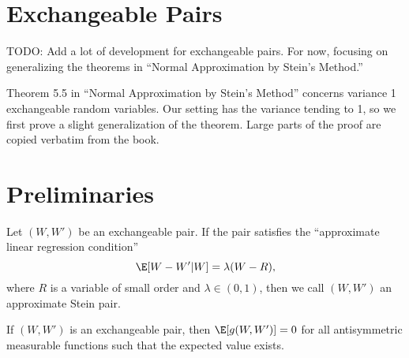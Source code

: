 \section{Exchangeable Pairs}
TODO: Add a lot of development for exchangeable pairs.  For now, focusing on generalizing the theorems
in ``Normal Approximation by Stein's Method.''

Theorem 5.5 in ``Normal Approximation by Stein's Method'' concerns variance 1 exchangeable
random variables.  Our setting has the variance tending to 1, so we first prove a slight
generalization of the theorem.  Large parts of the proof are copied verbatim from the book.

\section{Preliminaries}
\begin{definition}
  Let $(W, W')$ be an exchangeable pair.  If the pair satisfies the ``approximate linear
  regression condition''
  \begin{equation}
    \label{D:approx-stein-pair}
    \E [W - W' | W] = \lambda (W - R),
  \end{equation}
  where $R$ is a variable of small order and $\lambda \in (0, 1)$, then we call $(W, W')$ an
  approximate Stein pair.
\end{definition}

\begin{lemma}
  \label{L:antisymmetric}
  If $(W, W')$ is an exchangeable pair, then $\E [g(W, W')] = 0$ for all antisymmetric
  measurable functions such that the expected value exists.
\end{lemma}

